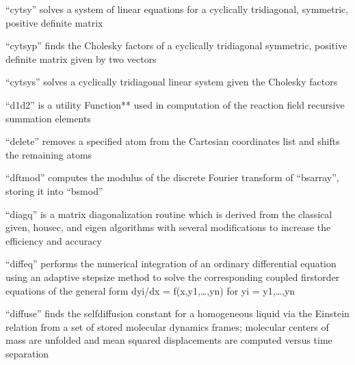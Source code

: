\documentclass[letterpaper,11pt,english]{sphinxmanual}
\begin{document}

“cytsy” solves a system of linear equations for a cyclically tridiagonal, symmetric, positive definite matrix


“cytsyp” finds the Cholesky factors of a cyclically tridiagonal symmetric, positive definite matrix given by two vectors


“cytsys” solves a cyclically tridiagonal linear system given the Cholesky factors


“d1d2” is a utility Function** used in computation of the reaction field recursive summation elements


“delete” removes a specified atom from the Cartesian coordinates list and shifts the remaining atoms





“dftmod” computes the modulus of the discrete Fourier transform of “bsarray”, storing it into “bsmod”


“diagq” is a matrix diagonalization routine which is derived from the classical given, housec, and eigen algorithms with several modifications to increase the efficiency and accuracy


“diffeq” performs the numerical integration of an ordinary differential equation using an adaptive stepsize method to solve the corresponding coupled first\sphinxhyphen{}order equations of the general form dyi/dx = f(x,y1,…,yn) for yi = y1,…,yn


“diffuse” finds the self\sphinxhyphen{}diffusion constant for a homogeneous liquid via the Einstein relation from a set of stored molecular dynamics frames; molecular centers of mass are unfolded and mean squared displacements are computed versus time separation
\end{document}
